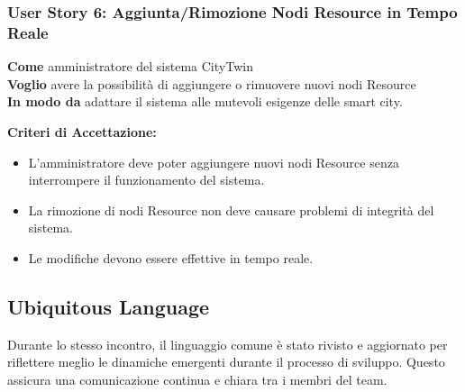 \subsubsection{User Story 6: Aggiunta/Rimozione Nodi Resource in Tempo Reale}

\textbf{Come} amministratore del sistema CityTwin \\
\textbf{Voglio} avere la possibilità di aggiungere o rimuovere nuovi nodi Resource \\
\textbf{In modo da} adattare il sistema alle mutevoli esigenze delle smart city.

\textbf{Criteri di Accettazione:}
\begin{itemize}
  \item L'amministratore deve poter aggiungere nuovi nodi Resource senza interrompere il funzionamento del sistema.
  \item La rimozione di nodi Resource non deve causare problemi di integrità del sistema.
  \item Le modifiche devono essere effettive in tempo reale.
\end{itemize}

\subsection{Ubiquitous Language}

Durante lo stesso incontro, il linguaggio comune è stato rivisto e aggiornato per riflettere meglio le dinamiche emergenti durante il processo di sviluppo. Questo assicura una comunicazione continua e chiara tra i membri del team.

